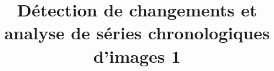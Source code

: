 \documentclass[fleqn,treatise,allpages]{ISTE_Science}
\title[D\'etection de changements et analyse de s\'eries chronologiques d'images 1]{D\'etection de changements et analyse de s\'eries chronologiques d'images 1}
\makeatletter
\def\@makefnmark{\raisebox{0.65ex}{\FonteAppelNote\@thefnmark}}
\renewcommand{\@makefntext}[1]{%
   \FonteNoteBasPage %
   \noindent\@Myfnmark#1 %
}%
\makeatother
\begin{document}
\makeatletter
{}
\def\tagform@#1{\maketag@@@{[#1]\@@italiccorr}}
\setlength{} \setlength{}
\setlength\marginparwidth{5.7pc}

\makeatletter
\setlength{}
\setlength{}
\makeatother

\makeatletter

\def\@makefnmark{\raisebox{0.55ex}{$\!$\FonteAppelNote \@thefnmark}}

\def\@Myfnmark{%
      \mbox{\arabic{footnote}.~}%
}

\renewcommand{\@makefntext}[1]{%
   \FonteNoteBasPage %
   \noindent\@Myfnmark#1 %
}%

\def\@makesfntext#1{
   \FonteNoteBasPage %
   \noindent #1 %
}%

\def\@thefnmark{\normalsize\arabic{footnote}}

\makeatother

\newenvironment{abstract}{%
\fontsize{8}{10.5}\sffamily
}
%

\frontmatter

\tableofcontents





\mainmatter


\setcounter{page}{1}


\makeatletter
\renewcommand{\@oddhead}{%
            \parbox{\textwidth}{%
                \@DrawPageFrame\hspace*{\fill}\color{chapBlue}\fontfamily{phv}\fontsize{8}{10}\selectfont{D\'etection de changements dans des s\'eries chronologiques d'images SAR polarim\'etrique\hspace{\@ESPage}\thepage\\\vskip-13.5pt\textcolor{chapBlue}\hrule}}}%
\makeatother



\end{document}
